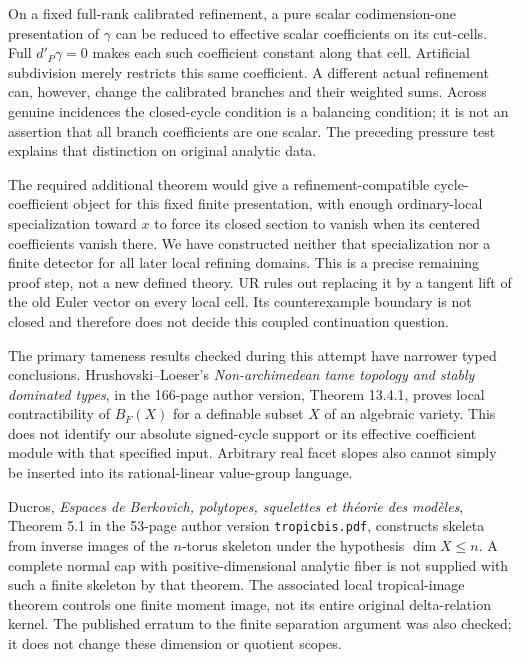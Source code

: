 On a fixed full-rank calibrated refinement, a pure scalar
codimension-one presentation of \(\gamma\) can be reduced to
effective scalar coefficients on its cut-cells.  Full
\(d'_P\gamma=0\) makes each such coefficient constant along
that cell.  Artificial subdivision merely restricts this same
coefficient.  A different actual refinement can, however, change
the calibrated branches and their weighted sums.  Across genuine
incidences the closed-cycle condition is a balancing condition;
it is not an assertion that all branch coefficients are one
scalar.  The preceding pressure test explains that distinction
on original analytic data.

The required additional theorem would give a refinement-compatible
cycle-coefficient object for this fixed finite presentation,
with enough ordinary-local specialization toward \(x\) to
force its closed section to vanish when its centered coefficients
vanish there.  We have constructed neither that specialization
nor a finite detector for all later local refining domains.
This is a precise remaining proof step, not a new defined theory.
UR rules out replacing it by a tangent lift of the old Euler
vector on every local cell.  Its counterexample boundary is not
closed and therefore does not decide this coupled continuation
question.

The primary tameness results checked during this attempt have
narrower typed conclusions.  Hrushovski--Loeser's
\emph{Non-archimedean tame topology and stably dominated types},
in the 166-page author version, Theorem 13.4.1, proves local
contractibility of \(B_F(X)\) for a definable subset \(X\) of
an algebraic variety.  This does not identify our absolute
signed-cycle support or its effective coefficient module with
that specified input.  Arbitrary real facet slopes also cannot
simply be inserted into its rational-linear value-group language.

Ducros, \emph{Espaces de Berkovich, polytopes, squelettes et
th\'eorie des mod\`eles}, Theorem 5.1 in the 53-page author
version \texttt{tropicbis.pdf}, constructs skeleta from inverse
images of the \(n\)-torus skeleton under the hypothesis
\(\dim X\le n\).  A complete normal cap with positive-dimensional
analytic fiber is not supplied with such a finite skeleton by
that theorem.  The associated local tropical-image theorem
controls one finite moment image, not its entire original
delta-relation kernel.  The published erratum to the finite
separation argument was also checked; it does not change these
dimension or quotient scopes.


